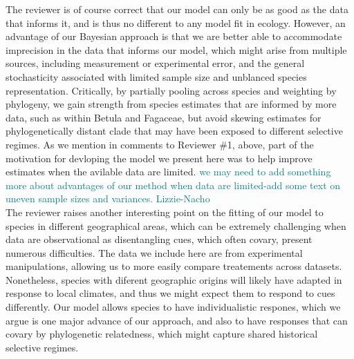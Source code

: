 \documentclass[11pt]{article}
\begin{document}
The reviewer is of course correct that our model can only be as good as the data that informs it, and is thus no different to any model fit in ecology. However, an advantage of our Bayesian approach is that we are better able to accommodate imprecision in the data that informs our model, which might arise from multiple sources, including measurement or experimental error, and the general stochasticity associated with limited sample size and unblanced species representation. Critically, by partially pooling across species and weighting by phylogeny, we gain strength from species estimates that are informed by more data, such as within Betula and Fagaceae, but avoid skewing estimates for phylogenetically distant clade that may have been exposed to different selective regimes. As we mention in comments to Reviewer \#1, above, part of the motivation for devloping the model we present here was to help improve estimates when the avilable data are limited. \textcolor{teal}{we may need to add something more about advantages of our method when data are limited-add some text on uneven sample sizes and variances. Lizzie-Nacho}  %
\\


The reviewer raises another interesting point on the fitting of our model to species in different geographical areas, which can be extremely challenging when data are observational as disentangling cues, which often covary, present numerous difficulties. The data we include here are from experimental manipulations, allowing us to more easily compare treatements across datasets. Nonetheless, species with diferent geographic origins will likely have adapted in response to local climates, and thus we might expect them to respond to cues differently. Our model allows species to have individualistic respones, which we argue is one major advance of our approach, and also to have responses that can covary by phylogenetic relatedness, which might capture shared historical selective regimes.\\   
\end{document}

